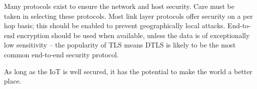 \documentclass[10pt,journal,compsoc]{IEEEtran}
\begin{document}
Many protocols exist to ensure the network and host security.  Care must be
taken in selecting these protocols. Most link layer protocols offer security on
a per hop basis; this should be enabled to prevent geographically local
attacks. End-to-end encryption should be used when available, unless the data
is of exceptionally low sensitivity -- the popularity of TLS means DTLS is
likely to be the most common end-to-end security protocol.   

As long as the IoT is well secured, it has the potential to make the world a
better place.  



%
%
%

\sloppy
{}

\end{document}
